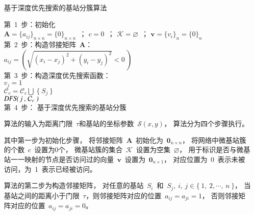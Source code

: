 \begin{algorithm}[!htb]
\caption{ 基于深度优先搜索的基站分簇算法 }
\label{algorithm_bs_dfs}
\small
{}
\Begin
{
    第~1~步：初始化\\
    $\mathbf{A}=\{a_{ij}\}_{n\times n}=\{0\}_{n\times n}$~；
    $c=0$~；
    $\mathcal{K}=\varnothing$~；
    $\mathbf{v}=\{v_i\}_n=\{0\}_n$~\\

    第~2~步：构造邻接矩阵~$\mathbf{A}$：\\
    {
          $a_{ij}=(\sqrt{({x_i} - {x_j})^2+(y_i-y_j)^2} < 0~)$  \\
    }
    第~3~步：构造深度优先搜索函数：\\
    {
      {
        {
          $v_{j}=1$ \\
          $\mathcal{C}_c=\mathcal{C}_c \bigcup~ \{~S_j~\}$\\
          $\emph{DFS(~j~,~}\mathcal{C}_c ~\emph{)}$\\
        }
      }
    }
    第~4~步： 基于深度优先搜索的基站分簇\\
    {
    }
}
\end{algorithm}

算法的输入为距离门限~$\tau$和基站的坐标参数~$\mathcal{S}(x,y)$，
算法分为四个步骤执行。

其中第一步为初始化步骤，
将邻接矩阵~$\mathbf{A}$~初始化为~$\mathbf{0}_{n\times n}$，
将网络中微基站簇的个数~$c$~设置为0个，
微基站簇的集合~$\mathcal{K}$~设置为空集~$\varnothing$，
用于标识是否与微基站一一映射的节点是否访问过的向量~$\mathbf{v}$~设置为~$\mathbf{0}_{n\times 1}$，
对应位置为~0~表示未被访问，为~1~表示已经被访问。

算法的第二步为构造邻接矩阵，
对任意的基站~$S_i$~和~$S_j, ~i, ~j \in \{~1,~2,\cdots,~n~\}$，
当基站之间的距离小于门限~$\tau$，则邻接矩阵对应的位置~$a_{ij}=a_{ji}=1$，
否则邻接矩阵对应的位置~$a_{ij}=a_{ji}=0$。

